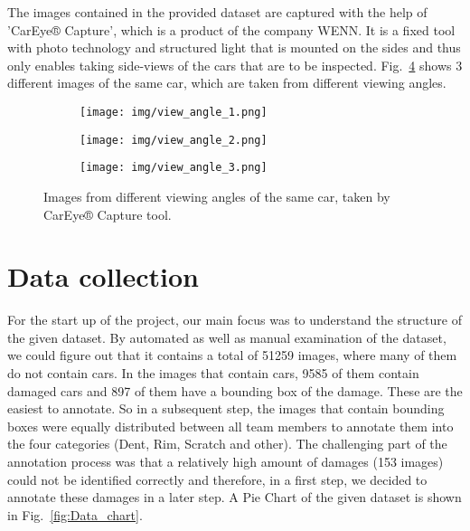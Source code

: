 \documentclass[lang=english,inputenc=utf8,fontsize=10pt]{ldvarticle}
\begin{document}
The images contained in the provided dataset are captured with the help of 'CarEye® Capture', which is a product of the company WENN. It is a fixed tool with photo technology and structured light that is mounted on the sides and thus only enables taking side-views of the cars that are to be inspected. Fig.~\ref{fig:whole_cars} shows 3 different images of the same car, which are taken from different viewing angles.\\
\begin{figure}
    \centering
    \begin{subfigure}{0.32\textwidth}
        \texttt{[image: img/view\_angle\_1.png]}
        \caption{\label{fig:reflective}}
        
    \end{subfigure} 
    \begin{subfigure}{0.32\textwidth}
            \texttt{[image: img/view\_angle\_2.png]}
            \caption{\label{fig:non_reflective}}
            
    \end{subfigure}
    \begin{subfigure}{0.32\textwidth}
            \texttt{[image: img/view\_angle\_3.png]}
            \caption{\label{fig:non_reflective}}
            
    \end{subfigure}

\caption[]{Images from different viewing angles of the same car, taken by CarEye® Capture tool.}
\label{fig:whole_cars}
\end{figure}

\section*{Data collection}

For the start up of the project, our main focus was to understand the structure of the given dataset. By automated as well as manual examination of the dataset, we could figure out that it contains a total of 51259  images, where many of them do not contain cars. In the images that contain cars, 9585 of them contain damaged cars and 897 of them have a bounding box of the damage. These are the easiest to annotate. So in a subsequent step, the images that contain bounding boxes were equally distributed between all team members to annotate them into the four categories (Dent, Rim, Scratch and other). The challenging part of the annotation process was that a relatively high amount of damages (153 images) could not be identified correctly and therefore, in a first step, we decided to annotate these damages in a later step. A Pie Chart of the given dataset is shown in Fig.~\ref{fig:Data_chart}.\\
\end{document}
